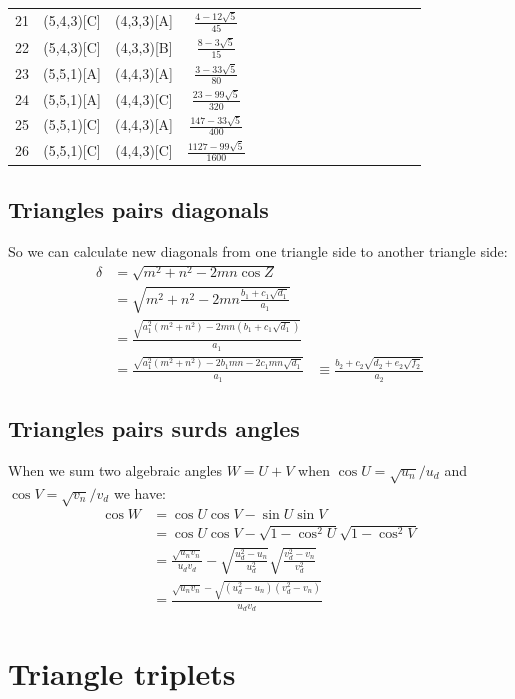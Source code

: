 \documentclass[11pt]{article}
\begin{document}
\begin{longtable}{ | p{1cm}| *{15}{c|} }
21 & (5,4,3)[C] & (4,3,3)[A] & $\frac{4-12\sqrt{5}}{45}$\\ %
22 & (5,4,3)[C] & (4,3,3)[B] & $\frac{8-3\sqrt{5}}{15}$\\ %
23 & (5,5,1)[A] & (4,4,3)[A] & $\frac{3-33\sqrt{5}}{80}$\\ %
24 & (5,5,1)[A] & (4,4,3)[C] & $\frac{23-99\sqrt{5}}{320}$\\ %
25 & (5,5,1)[C] & (4,4,3)[A] & $\frac{147-33\sqrt{5}}{400}$\\ %
26 & (5,5,1)[C] & (4,4,3)[C] & $\frac{1127-99\sqrt{5}}{1600}$\\ %
\end{longtable}

\subsection{Triangles pairs diagonals}


So we can calculate new diagonals from one triangle side to another triangle side:
\begin{align}
\delta &= \sqrt{m^2 + n^2 - 2mn\cos{Z}}\\
 &= \sqrt{m^2 + n^2 - 2mn\frac{b_1+c_1\sqrt{d_1}}{a_1}}\\
 &= \frac{\sqrt{a_1^2(m^2 + n^2) - 2mn(b_1 + c_1\sqrt{d_1})}}{a_1}\\
 &= \frac{\sqrt{a_1^2(m^2 + n^2) - 2b_1mn - 2c_1mn\sqrt{d_1} }}{a_1} &\equiv \frac{b_2 + c_2\sqrt{d_2 + e_2\sqrt{f_2}}}{a_2}
\end{align}

\subsection{Triangles pairs surds angles}

When we sum two algebraic angles $W = U+V$ when $\cos{U} = \sqrt{u_n}/u_d$ and $\cos{V} = \sqrt{v_n}/v_d$ we have:
\begin{align}
\cos{W} &= \cos{U}\cos{V} - \sin{U}\sin{V}\\
 &= \cos{U}\cos{V} - \sqrt{1 - \cos^2{U}}\sqrt{1 - \cos^2{V}}\\
 &= \frac{\sqrt{u_nv_n}}{u_dv_d} - \sqrt{\frac{u_d^2 - u_n}{u_d^2}} \sqrt{\frac{v_d^2 - v_n}{v_d^2}}\\
 &= \frac{\sqrt{u_nv_n} - \sqrt{(u_d^2 - u_n)(v_d^2 - v_n)} }{u_dv_d}
\end{align}

\section{Triangle triplets}
\end{document}
